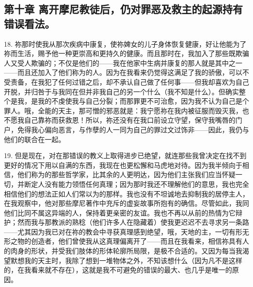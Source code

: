 \subsection{第十章 离开摩尼教徒后，仍对罪恶及救主的起源持有错误看法。}

18. 祢那时使我从那次疾病中康复，使祢婢女的儿子身体恢复健康，好让他能为了祢而生活，赐予他一种更崇高和更持久的健康。而且那时在，我加入了那些既欺骗人又受人欺骗的；不仅是他们的——我在他家中生病并康复的那人就是其中之一——而且还加入了他们称为的人。因为在我看来仍觉得这满足了我的骄傲，可以不受责备，在我犯了任何过错之后，却不承认自己做了任何事——但我却喜欢为自己开脱，并归咎于与我同在但并非我自己的另一个什么（我不知是什么）。但确实整个是我，是我的不虔使我与自己分裂；而那罪更不可治愈，因为我不认为自己是个罪人。哦，全能的天主，那可憎的邪恶就是：我宁愿祢在我内被征服而毁灭我，也不愿我自己靠祢而获救恩！所以，祢还没有在我口前设立守望，保守我嘴唇的门户，免得我心偏向恶言，与作孽的人一同为自己的罪过文过饰非——因此，我仍与他们的联合在一起。\par

19. 但是现在，对在那错误的教义上取得进步已绝望，就连那些我曾决定在找不到更好的情况下用以自满的东西，我现在也更松懈和马虎地对待。因为我半倾向于相信，他们称为的那些哲学家，比其余的人更明达，因为他们主张我们应当怀疑一切，并断定人没有能力领悟任何真理；因为那时我还不理解他们的意思，我也完全相信他们的想法正如人们常以为的那样。我也没有不坦诚地去抑制我的居停主人，在我观察中，他对那些摩尼著作中充斥的虚妄故事所抱有的确信。尽管如此，我同他们比同不属这异端的人，保持着更亲密的友谊。我也不再以从前的热情为它辩护；然而我与那教派的熟稔（他们许多人在隐藏着）使我更迟迟不去寻求另一条路——尤其因为我已对在祢的教会中寻获真理感到绝望，哦，天地的主，一切有形无形之物的创造者，他们曾使我从这真理偏离开了——而且在我看来，相信祢具有人的肉身的形状，并受我们肢体的形体轮廓所局限，是极不合适的。又因为每当我渴望默想我的天主时，我除了想到一堆物体之外，不知该想什么（因为凡不是这样的，在我看来就不存在），这就是我不可避免的错误的最大、也几乎是唯一的原因。\par

